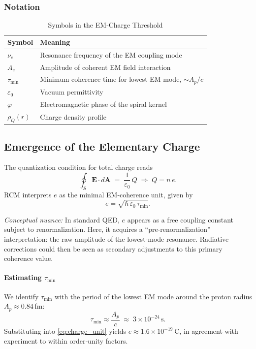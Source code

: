 \subsubsection*{Notation}
\begin{table}[ht]
  \centering
  \caption{Symbols in the EM‐Charge Threshold}
  \begin{tabular}{@{}ll@{}}
    \toprule
    Symbol & Meaning \\
    \midrule
    \(\nu_e\)       & Resonance frequency of the EM coupling mode \\
    \(A_e\)         & Amplitude of coherent EM field interaction \\
    \(\tau_{\min}\) & Minimum coherence time for lowest EM mode, \(\sim A_p/c\) \\
    \(\varepsilon_0\)& Vacuum permittivity \\
    \(\varphi\)     & Electromagnetic phase of the spiral kernel \\
    \(\rho_Q(r)\)   & Charge density profile \\
    \bottomrule
  \end{tabular}
\end{table}

\subsection{Emergence of the Elementary Charge}
The quantization condition for total charge reads
\begin{equation}\label{eq:gauss_charge}
\oint_{S}\mathbf{E}\cdot d\mathbf{A}
\;=\;\frac{1}{\varepsilon_0}\,Q
\;\Longrightarrow\;
Q=n\,e.
\end{equation}
RCM interprets \(e\) as the minimal EM‐coherence unit, given by
\begin{equation}\label{eq:charge_unit}
e = \sqrt{\hbar\,\varepsilon_0\,\tau_{\min}}.
\end{equation}

\vspace{1ex}
\noindent\emph{Conceptual nuance:}  In standard QED, \(e\) appears as a free coupling constant subject to renormalization.  Here, it acquires a “pre‐renormalization” interpretation: the raw amplitude of the lowest‐mode resonance.  Radiative corrections could then be seen as secondary adjustments to this primary coherence value.

\paragraph{Estimating \(\tau_{\min}\)}  
We identify \(\tau_{\min}\) with the period of the lowest EM mode around the proton radius \(A_p\approx0.84\) fm:
\[
\tau_{\min} \approx \frac{A_p}{c}
\;\approx\;
3\times10^{-24}\,\mathrm{s}.
\]
Substituting into \eqref{eq:charge_unit} yields \(e\approx1.6\times10^{-19}\) C, in agreement with experiment to within order‐unity factors.

